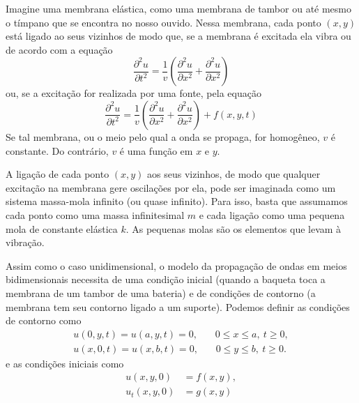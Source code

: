	        Imagine uma membrana elástica, como uma membrana de tambor ou até mesmo o tímpano que se encontra no nosso ouvido. Nessa membrana, cada ponto $(x, y)$ está ligado ao seus vizinhos de modo que, se a membrana é excitada ela vibra ou de acordo com a equação
	        \begin{equation}
	            \dfrac{\partial^2u}{\partial t^2} = \frac{1}{v}(\dfrac{\partial^2u}{\partial x^2} + \dfrac{\partial^2u}{\partial x^2})
	        \end{equation}
	        ou, se a excitação for realizada por uma fonte, pela equação
	        \begin{equation}
	            \dfrac{\partial^2u}{\partial t^2} = \frac{1}{v}(\dfrac{\partial^2u}{\partial x^2} + \dfrac{\partial^2u}{\partial x^2}) + f(x, y, t)
	        \end{equation}
	        Se tal membrana, ou o meio pelo qual a onda se propaga, for homogêneo, $v$ é constante. Do contrário, $v$ é uma função em $x$ e $y$.
	        
	        A ligação de cada ponto $(x, y)$ aos seus vizinhos, de modo que qualquer excitação na membrana gere oscilações por ela, pode ser imaginada como um sistema massa-mola infinito (ou quase infinito). Para isso, basta que assumamos cada ponto como uma massa infinitesimal $m$ e cada ligação como uma pequena mola de constante elástica $k$. As pequenas molas são os elementos que levam à vibração.
	        
	        Assim como o caso unidimensional, o modelo da propagação de ondas em meios bidimensionais necessita de uma condição inicial (quando a baqueta toca a membrana de um tambor de uma bateria) e de condições de contorno (a membrana tem seu contorno ligado a um suporte). Podemos definir as condições de contorno como \cite{dailedaWE}
	        \begin{align}
	            \label{eq:condContorno}
	            u(0, y, t) = u(a, y, t) = 0,\ \ \ \ \ \ \ \ 0\le x \le a, \ t \ge 0,\\
	            u(x, 0, t) = u(x, b, t) = 0,\ \ \ \ \ \ \ \ 0\le y \le b, \ t \ge 0.
	        \end{align}
	        e as condições iniciais como
	        \begin{align}
	        \label{eq:condIniciais}
	            u(x, y, 0) &= f(x, y),\\
	            u_t(x, y, 0) &= g(x, y)
	        \end{align}